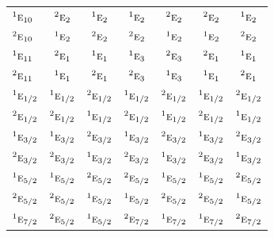 \documentclass[10pt,a4paper]{article}
\numberwithin{equation}{section}
\newcommand{\irr}[1]{\text{\normalfont\scshape #1}}
\newcommand{\conjpair}[1]{{}^{#1}}
\begin{document}
{\begin{longtable}{@{}lcccccc@{}}
$\conjpair{1}\irr{e}_{10}$ & $\conjpair{2}\irr{e}_{2}$ & $\conjpair{1}\irr{e}_{2}$ & $\conjpair{1}\irr{e}_{2}$ & $\conjpair{2}\irr{e}_{2}$ & $\conjpair{2}\irr{e}_{2}$ & $\conjpair{1}\irr{e}_{2}$\\
$\conjpair{2}\irr{e}_{10}$ & $\conjpair{1}\irr{e}_{2}$ & $\conjpair{2}\irr{e}_{2}$ & $\conjpair{2}\irr{e}_{2}$ & $\conjpair{1}\irr{e}_{2}$ & $\conjpair{1}\irr{e}_{2}$ & $\conjpair{2}\irr{e}_{2}$\\
$\conjpair{1}\irr{e}_{11}$ & $\conjpair{2}\irr{e}_{1}$ & $\conjpair{1}\irr{e}_{1}$ & $\conjpair{1}\irr{e}_{3}$ & $\conjpair{2}\irr{e}_{3}$ & $\conjpair{2}\irr{e}_{1}$ & $\conjpair{1}\irr{e}_{1}$\\
$\conjpair{2}\irr{e}_{11}$ & $\conjpair{1}\irr{e}_{1}$ & $\conjpair{2}\irr{e}_{1}$ & $\conjpair{2}\irr{e}_{3}$ & $\conjpair{1}\irr{e}_{3}$ & $\conjpair{1}\irr{e}_{1}$ & $\conjpair{2}\irr{e}_{1}$\\
$\conjpair{1}\irr{e}_{1/2}$ & $\conjpair{1}\irr{e}_{1/2}$ & $\conjpair{2}\irr{e}_{1/2}$ & $\conjpair{1}\irr{e}_{1/2}$ & $\conjpair{2}\irr{e}_{1/2}$ & $\conjpair{1}\irr{e}_{1/2}$ & $\conjpair{2}\irr{e}_{1/2}$\\
$\conjpair{2}\irr{e}_{1/2}$ & $\conjpair{2}\irr{e}_{1/2}$ & $\conjpair{1}\irr{e}_{1/2}$ & $\conjpair{2}\irr{e}_{1/2}$ & $\conjpair{1}\irr{e}_{1/2}$ & $\conjpair{2}\irr{e}_{1/2}$ & $\conjpair{1}\irr{e}_{1/2}$\\
$\conjpair{1}\irr{e}_{3/2}$ & $\conjpair{1}\irr{e}_{3/2}$ & $\conjpair{2}\irr{e}_{3/2}$ & $\conjpair{1}\irr{e}_{3/2}$ & $\conjpair{2}\irr{e}_{3/2}$ & $\conjpair{1}\irr{e}_{3/2}$ & $\conjpair{2}\irr{e}_{3/2}$\\
$\conjpair{2}\irr{e}_{3/2}$ & $\conjpair{2}\irr{e}_{3/2}$ & $\conjpair{1}\irr{e}_{3/2}$ & $\conjpair{2}\irr{e}_{3/2}$ & $\conjpair{1}\irr{e}_{3/2}$ & $\conjpair{2}\irr{e}_{3/2}$ & $\conjpair{1}\irr{e}_{3/2}$\\
$\conjpair{1}\irr{e}_{5/2}$ & $\conjpair{1}\irr{e}_{5/2}$ & $\conjpair{2}\irr{e}_{5/2}$ & $\conjpair{2}\irr{e}_{5/2}$ & $\conjpair{1}\irr{e}_{5/2}$ & $\conjpair{1}\irr{e}_{5/2}$ & $\conjpair{2}\irr{e}_{5/2}$\\
$\conjpair{2}\irr{e}_{5/2}$ & $\conjpair{2}\irr{e}_{5/2}$ & $\conjpair{1}\irr{e}_{5/2}$ & $\conjpair{1}\irr{e}_{5/2}$ & $\conjpair{2}\irr{e}_{5/2}$ & $\conjpair{2}\irr{e}_{5/2}$ & $\conjpair{1}\irr{e}_{5/2}$\\
$\conjpair{1}\irr{e}_{7/2}$ & $\conjpair{2}\irr{e}_{5/2}$ & $\conjpair{1}\irr{e}_{5/2}$ & $\conjpair{2}\irr{e}_{7/2}$ & $\conjpair{1}\irr{e}_{7/2}$ & $\conjpair{1}\irr{e}_{7/2}$ & $\conjpair{2}\irr{e}_{7/2}$\\

\end{longtable}}
\end{document}

